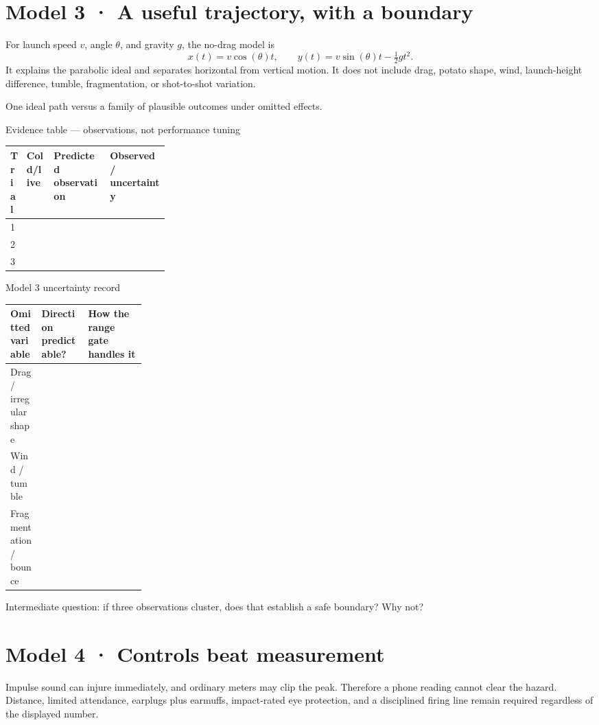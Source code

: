 \section{Model 3 · A useful trajectory, with a boundary}
For launch speed \(v\), angle \(\theta\), and gravity \(g\), the no-drag model is
\[
x(t)=v\cos(\theta)t,\qquad
y(t)=v\sin(\theta)t-\tfrac12gt^2 .
\]
It explains the parabolic ideal and separates horizontal from vertical motion.
It does not include drag, potato shape, wind, launch-height difference, tumble,
fragmentation, or shot-to-shot variation.

{One ideal path versus a family of plausible outcomes under omitted effects.}

\begin{teloscard}{Evidence table — observations, not performance tuning}
\begin{tabularx}{\linewidth}{@{}p{0.10\linewidth}p{0.17\linewidth}L L@{}}
\textbf{Trial} & \textbf{Cold/live} & \textbf{Predicted observation} &
\textbf{Observed / uncertainty}\\ &&&\\[1.2em] 2&&&\\[1.2em] 3&&&\\
\end{tabularx}
\end{teloscard}

\begin{teloscard}{Model 3 uncertainty record}
\begin{tabularx}{\linewidth}{@{}p{0.23\linewidth}L L@{}}
\textbf{Omitted variable} & \textbf{Direction predictable?} &
\textbf{How the range gate handles it}\\ \midrule
Drag / irregular shape &&\\[1em]
Wind / tumble &&\\[1em]
Fragmentation / bounce &&\\
\end{tabularx}

Intermediate question: if three observations cluster, does that establish a
safe boundary? Why not? \hrulefill
\end{teloscard}

\section{Model 4 · Controls beat measurement}
Impulse sound can injure immediately, and ordinary meters may clip the peak.
Therefore a phone reading cannot clear the hazard. Distance, limited attendance,
earplugs plus earmuffs, impact-rated eye protection, and a disciplined firing
line remain required regardless of the displayed number.

